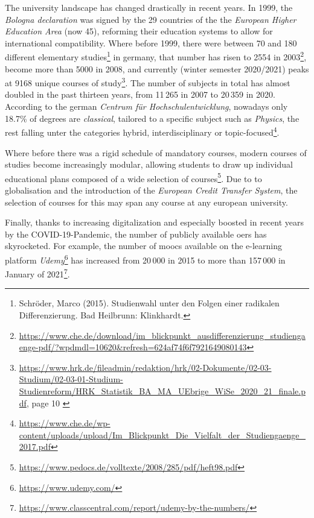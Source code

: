 The university landscape has changed drastically in recent years. In 1999, the \textit{Bologna declaration} was signed by the 29 countries of the the \textit{European Higher Education Area} (now 45), reforming their education systems to allow for international compatibility. Where before 1999, there were between 70 and 180 different elementary studies\footnote{ Schröder, Marco (2015). Studienwahl unter den Folgen einer radikalen Differenzierung. Bad Heilbrunn: Klinkhardt.} in germany, that number has risen to 2554 in 2003\footnote{\url{https://www.che.de/download/im_blickpunkt_ausdifferenzierung_studiengaenge-pdf/?wpdmdl=10620&refresh=624af74f6f7921649080143}}, become more than 5000 in 2008, and currently (winter semester 2020/2021) peaks at 9168 unique courses of study\footnote{\url{https://www.hrk.de/fileadmin/redaktion/hrk/02-Dokumente/02-03-Studium/02-03-01-Studium-Studienreform/HRK_Statistik_BA_MA_UEbrige_WiSe_2020_21_finale.pdf}, page 10 \label{fnote:degreenums}}. The number of subjects in total has almost doubled in the past thirteen years, from 11\,265 in 2007 to 20\,359 in 2020. According to the german \textit{Centrum für Hochschulentwicklung}, nowadays only 18.7\% of degrees are \textit{classical}, \ie tailored to a specific subject such as \textit{Physics}, the rest falling unter the categories hybrid, interdisciplinary or topic-focused\footnote{\url{https://www.che.de/wp-content/uploads/upload/Im_Blickpunkt_Die_Vielfalt_der_Studiengaenge_2017.pdf}}.

Where before there was a rigid schedule of mandatory courses, modern courses of studies become increasingly modular, allowing students to draw up individual educational plans composed of a wide selection of courses\footnote{\url{https://www.pedocs.de/volltexte/2008/285/pdf/heft98.pdf}}. Due to to globalisation and the introduction of the \emph{European Credit Transfer System}, the selection of courses for this may span any course at any european university.

Finally, thanks to increasing digitalization and especially boosted in recent years by the COVID-19-Pandemic, the number of publicly available \glspl{oer} has skyrocketed. For example, the number of \glspl{mooc} available on the e-learning platform \textit{Udemy}\footnote{\url{https://www.udemy.com/}} has increased from 20\,000 in 2015 to more than 157\,000 in January of 2021\footnote{\url{https://www.classcentral.com/report/udemy-by-the-numbers/}}.

